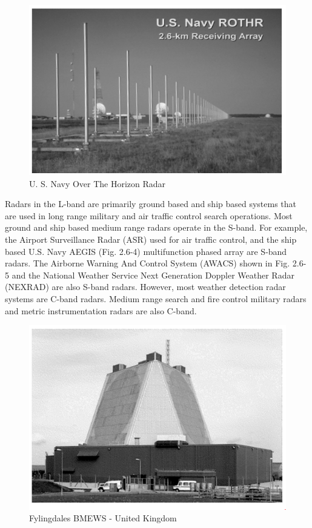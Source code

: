 \documentclass[14pt]{article} %
\begin{document}
 \begin{figure}[H]
  \includegraphics[width=\linewidth]{Horizonradar.png}
  \caption{U. S. Navy Over The Horizon Radar}
  \label{fig:figure 4}
\end{figure}
Radars in the L-band are primarily ground based and ship based systems that are used in long range military and air traffic control search operations. Most ground and ship based medium range radars operate in the S-band. For example, the Airport Surveillance Radar (ASR) used for air traffic control, and the ship based U.S. Navy AEGIS (Fig. 2.6-4) multifunction phased array are S-band radars. The Airborne Warning And Control System (AWACS) shown in Fig. 2.6-5 and the National Weather Service Next Generation Doppler Weather Radar (NEXRAD) are also S-band radars. However, most weather detection radar systems are C-band radars. Medium range search and fire control military radars and metric instrumentation radars are also C-band.


 \begin{figure}[H]
  \includegraphics[width=\linewidth]{fylingdales.png}
  \caption{Fylingdales BMEWS - United Kingdom}
  \label{fig:figure 5}
\end{figure}
\end{document}
